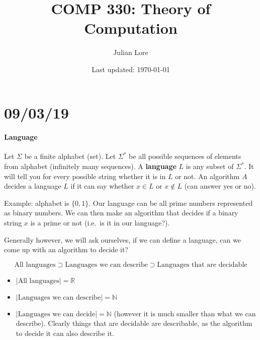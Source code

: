 \documentclass[12 pt]{article}
\author{Julian Lore}
\date{Last updated: \today}
\title{COMP 330: Theory of Computation}
\begin{document}
\onehalfspacing
\maketitle
\tableofcontents
\section{09/03/19}
\paragraph{Language}
Let $\Sigma$ be a finite alphabet (set). Let $\Sigma^*$ be all possible
sequences of elements from alphabet (infinitely many sequences). A
\textbf{language} $L$ is any subset of $\Sigma^*$. It will tell you for
every possible string whether it is in $L$ or not. An algorithm $A$
decides a language $L$ if it can say whether $x\in L$ or $x\notin L$
(can answer yes or no).

Example: alphabet is $\{0,1\}$. Our language can be all prime numbers
represented as binary numbers. We can then make an algorithm that
decides if a binary string $x$ is a prime or not (i.e.\ is it in our language?).

Generally however, we will ask ourselves, if we can define a language,
can we come up with an algorithm to decide it?

$$\text{All languages} \supset \text{Languages we can describe}
\supset \text{Languages that are decidable}$$
\begin{itemize}
\item $|\text{All languages}| = \mathbb{R}$
\item $|\text{Languages we can describe}| = \mathbb{N}$
\item $|\text{Languages we can decide}| = \mathbb{N}$ (however it is
  much smaller than what we can describe). Clearly things that are
  decidable are describable, as the algorithm to decide it can also
  describe it.
\end{itemize}
\end{document}
